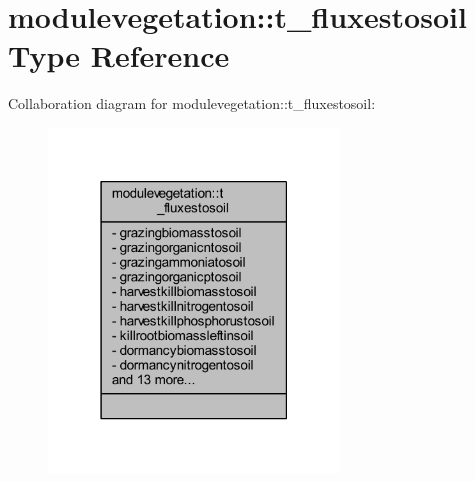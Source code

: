 \hypertarget{structmodulevegetation_1_1t__fluxestosoil}{}\section{modulevegetation\+:\+:t\+\_\+fluxestosoil Type Reference}
\label{structmodulevegetation_1_1t__fluxestosoil}


Collaboration diagram for modulevegetation\+:\+:t\+\_\+fluxestosoil\+:\nopagebreak
\begin{figure}[H]
\begin{center}
\leavevmode
\includegraphics[width=219pt]{structmodulevegetation_1_1t__fluxestosoil__coll__graph}
\end{center}
\end{figure}
